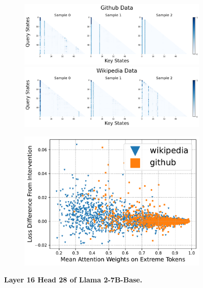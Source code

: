 \begin{figure}
    \centering
    \begin{subfigure}[t]{0.475\textwidth}
        \centering
        \caption{}
        \includegraphics[width=\linewidth]{Figures/L16H28/github.png}
        \includegraphics[width=\linewidth]{Figures/L16H28/wikipedia.png}
    \end{subfigure}
    \begin{subfigure}[t]{0.475\textwidth}
        \centering
        \caption{}
        \includegraphics[width=\linewidth]{Figures/L16H28/intervention.pdf}
    \end{subfigure}
    \caption{\small \textbf{Layer 16 Head 28 of Llama 2-7B-Base.}}
    \label{fig:llama_l16h28}
\end{figure}


